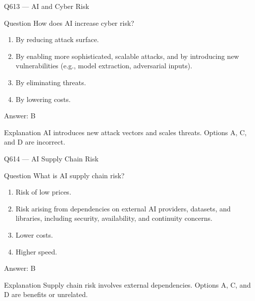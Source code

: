 \documentclass[aspectratio=169,8pt]{beamer}
\begin{document}
	\begin{frame}{Q613 --- AI and Cyber Risk}
		\begin{block}{Question}
			How does AI increase cyber risk?
			\begin{enumerate}
				\item By reducing attack surface.
				\item By enabling more sophisticated, scalable attacks, and by introducing new vulnerabilities (e.g., model extraction, adversarial inputs).
				\item By eliminating threats.
				\item By lowering costs.
			\end{enumerate}
		\end{block}
		\begin{exampleblock}{Answer: B}\end{exampleblock}
		\begin{block}{Explanation}
			AI introduces new attack vectors and scales threats. Options A, C, and D are incorrect.
		\end{block}
	\end{frame}
	
	\begin{frame}{Q614 --- AI Supply Chain Risk}
		\begin{block}{Question}
			What is AI supply chain risk?
			\begin{enumerate}
				\item Risk of low prices.
				\item Risk arising from dependencies on external AI providers, datasets, and libraries, including security, availability, and continuity concerns.
				\item Lower costs.
				\item Higher speed.
			\end{enumerate}
		\end{block}
		\begin{exampleblock}{Answer: B}\end{exampleblock}
		\begin{block}{Explanation}
			Supply chain risk involves external dependencies. Options A, C, and D are benefits or unrelated.
		\end{block}
	\end{frame}
	
\end{document}
